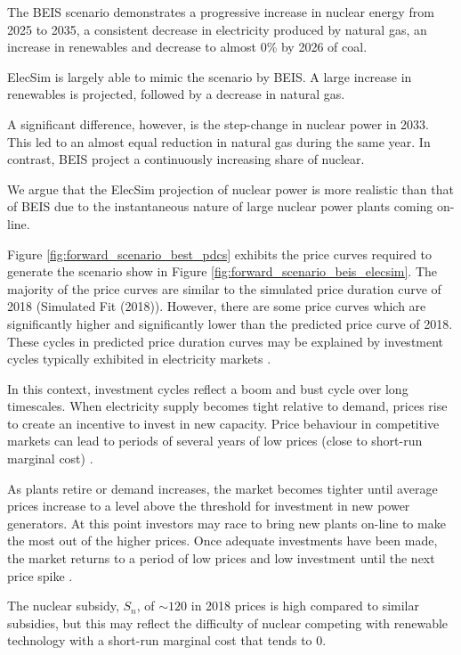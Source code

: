 The BEIS scenario demonstrates a progressive increase in nuclear energy from 2025 to 2035, a consistent decrease in electricity produced by natural gas, an increase in renewables and decrease to almost 0\% by 2026 of coal.

ElecSim is largely able to mimic the scenario by BEIS. A large increase in renewables is projected, followed by a decrease in natural gas. 

A significant difference, however, is the step-change in nuclear power in 2033. This led to an almost equal reduction in natural gas during the same year. In contrast, BEIS project a continuously increasing share of nuclear. 

We argue that the ElecSim projection of nuclear power is more realistic than that of BEIS due to the instantaneous nature of large nuclear power plants coming on-line.

Figure \ref{fig:forward_scenario_best_pdcs} exhibits the price curves required to generate the scenario show in Figure \ref{fig:forward_scenario_beis_elecsim}. The majority of the price curves are similar to the simulated price duration curve of 2018 (Simulated Fit (2018)). However, there are some price curves which are significantly higher and significantly lower than the predicted price curve of 2018. These cycles in predicted price duration curves may be explained by investment cycles typically exhibited in electricity markets \cite{Gross2007}. 

In this context, investment cycles reflect a boom and bust cycle over long timescales. When electricity supply becomes tight relative to demand, prices rise to create an incentive to invest in new capacity. Price behaviour in competitive markets can lead to periods of several years of low prices (close to short-run marginal cost) \cite{white2005concentrated}. 

As plants retire or demand increases, the market becomes tighter until average prices increase to a level above the threshold for investment in new power generators. At this point investors may race to bring new plants on-line to make the most out of the higher prices. Once adequate investments have been made, the market returns to a period of low prices and low investment until the next price spike \cite{Gross2007}. 


The nuclear subsidy, $S_n$, of ${\sim}$\textsterling $120$ in 2018 prices is high compared to similar subsidies, but this may reflect the difficulty of nuclear competing with renewable technology with a short-run marginal cost that tends to \textsterling $0$.

